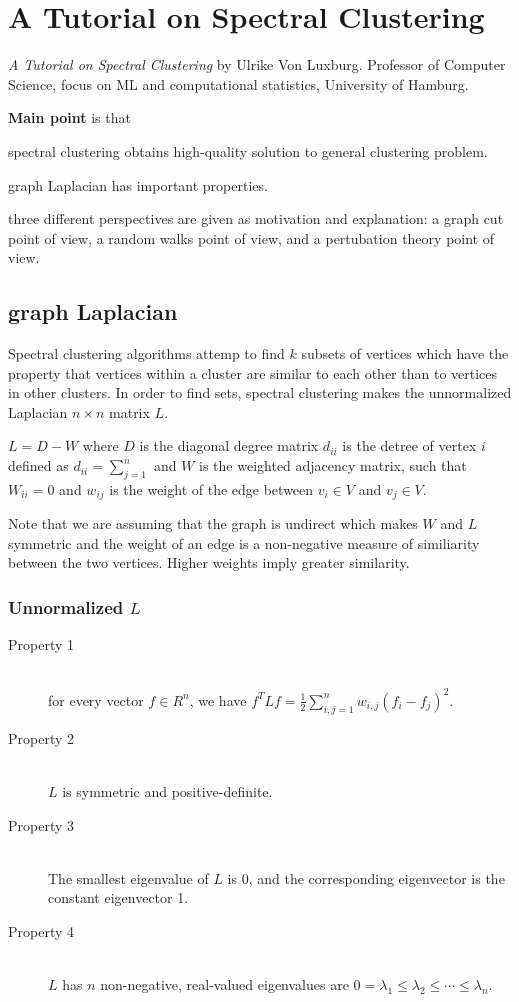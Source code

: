 \section{A Tutorial on Spectral Clustering}
\label{ch:ulrike07}

\textit{A Tutorial on Spectral Clustering} by Ulrike Von Luxburg. Professor of Computer Science, focus on ML and computational statistics, University of Hamburg.
\newline

\textbf{Main point} is that \begin{inparaenum}
\item spectral clustering obtains high-quality solution to general clustering problem.
\item graph Laplacian has important properties.
\item three different perspectives  are given as motivation and explanation: a graph cut point of view, a random walks point of view, and a pertubation theory point of view.
\end{inparaenum}

\subsection{graph Laplacian}
Spectral clustering algorithms attemp to find $k$ subsets of vertices which have the property that vertices within a cluster are similar to each other than to vertices in other clusters. In order to find sets, spectral clustering makes the unnormalized Laplacian $n \times n$ matrix $L$.

$L = D - W$ where $D$ is the diagonal degree matrix $d_{ii}$ is the detree of vertex $i$ defined as $d_{ii} = \sum_{j=1}^n$ and $W$ is the weighted adjacency matrix, such that $W_{ii} = 0$ and $w_{ij}$ is the weight of the edge between $v_i \in V$ and $v_j \in V$.

Note that we are assuming that the graph is undirect which makes $W$ and $L$ symmetric and the weight of an edge is a non-negative measure of similiarity between the two vertices. Higher weights imply greater similarity.

\subsubsection{Unnormalized $L$}
\begin{description}
\item[Property 1] \hfill \\
for every vector $f \in R^n$, we have $f^T L f = \frac{1}{2} \sum_{i,j=1}^{n} w_{i,j}(f_i - f_j)^2$.
\item[Property 2] \hfill \\
$L$ is symmetric and positive-definite.
\item[Property 3] \hfill \\
The smallest eigenvalue of $L$ is 0, and the corresponding eigenvector is the constant eigenvector 1.
\item[Property 4] \hfill \\
$L$ has $n$ non-negative, real-valued eigenvalues are $0 = \lambda_1 \leq \lambda_2 \leq \cdots \leq  \lambda_n$.
\end{description}

